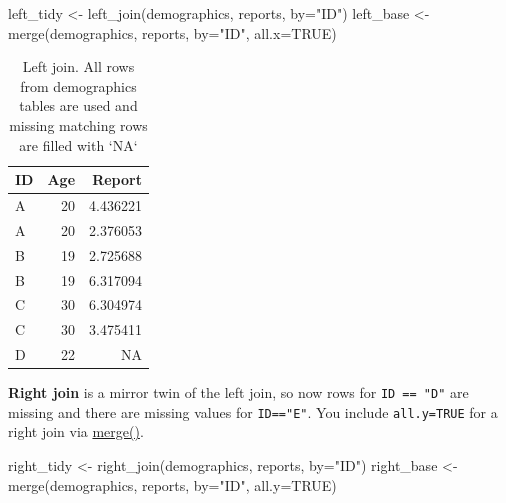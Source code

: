 \documentclass[
]{book}
\newenvironment{Shaded}{\begin{snugshade}}{\end{snugshade}}
\newcommand{\AttributeTok}[1]{\textcolor[rgb]{0.77,0.63,0.00}{#1}}
\newcommand{\ConstantTok}[1]{\textcolor[rgb]{0.00,0.00,0.00}{#1}}
\newcommand{\FunctionTok}[1]{\textcolor[rgb]{0.00,0.00,0.00}{#1}}
\newcommand{\NormalTok}[1]{#1}
\newcommand{\OtherTok}[1]{\textcolor[rgb]{0.56,0.35,0.01}{#1}}
\newcommand{\StringTok}[1]{\textcolor[rgb]{0.31,0.60,0.02}{#1}}
\begin{document}
\begin{Shaded}
\begin{Highlighting}[]
\NormalTok{left\_tidy }\OtherTok{\textless{}{-}} \FunctionTok{left\_join}\NormalTok{(demographics, reports, }\AttributeTok{by=}\StringTok{"ID"}\NormalTok{)}
\NormalTok{left\_base }\OtherTok{\textless{}{-}} \FunctionTok{merge}\NormalTok{(demographics, reports, }\AttributeTok{by=}\StringTok{"ID"}\NormalTok{, }\AttributeTok{all.x=}\ConstantTok{TRUE}\NormalTok{)}
\end{Highlighting}
\end{Shaded}

\begin{table}

\caption{\label{tab:unnamed-chunk-186}Left join. All rows from demographics tables are used and missing matching rows are filled with `NA`}
\centering
\begin{tabular}[t]{l|r|r}
\hline
ID & Age & Report\\
\hline
A & 20 & 4.436221\\
\hline
A & 20 & 2.376053\\
\hline
B & 19 & 2.725688\\
\hline
B & 19 & 6.317094\\
\hline
C & 30 & 6.304974\\
\hline
C & 30 & 3.475411\\
\hline
D & 22 & NA\\
\hline
\end{tabular}
\end{table}

\textbf{Right join} is a mirror twin of the left join, so now rows for \texttt{ID\ ==\ "D"} are missing and there are missing values for \texttt{ID=="E"}. You include \texttt{all.y=TRUE} for a right join via \href{https://stat.ethz.ch/R-manual/R-devel/library/base/html/merge.html}{merge()}.

\begin{Shaded}
\begin{Highlighting}[]
\NormalTok{right\_tidy }\OtherTok{\textless{}{-}} \FunctionTok{right\_join}\NormalTok{(demographics, reports, }\AttributeTok{by=}\StringTok{"ID"}\NormalTok{) }
\NormalTok{right\_base }\OtherTok{\textless{}{-}} \FunctionTok{merge}\NormalTok{(demographics, reports, }\AttributeTok{by=}\StringTok{"ID"}\NormalTok{, }\AttributeTok{all.y=}\ConstantTok{TRUE}\NormalTok{)}
\end{Highlighting}
\end{Shaded}
\end{document}
